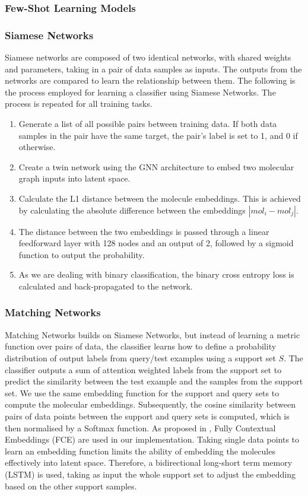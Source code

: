 \subsubsection{Few-Shot Learning Models}

\subsubsection{Siamese Networks}

Siamese networks \citep{koch2015siamese} are composed of two identical networks, with shared weights and parameters, taking in a pair of data samples as inputs. The outputs from the networks are compared to learn the relationship between them. The following is the process employed for learning a classifier using Siamese Networks. The process is repeated for all training tasks.

\begin{enumerate}
    \item Generate a list of all possible pairs between training data. If both data samples in the pair have the same target, the pair's label is set to 1, and 0 if otherwise.
    \item Create a twin network using the \ac{GNN} architecture to embed two molecular graph inputs into latent space.
    \item Calculate the L1 distance between the molecule embeddings. This is achieved by calculating the absolute difference between the embeddings $|mol_i-mol_j|$.
    \item The distance between the two embeddings is passed through a linear feedforward layer with 128 nodes and an output of 2, followed by a sigmoid function to output the probability.
    \item As we are dealing with binary classification, the binary cross entropy loss is calculated and back-propagated to the network.
\end{enumerate}

\subsubsection{Matching Networks}

Matching Networks builds on Siamese Networks, but instead of learning a metric function over pairs of data, the classifier learns how to define a probability distribution of output labels from query/test examples using a support set $S$. The classifier outputs a sum of attention weighted labels from the support set to predict the similarity between the test example and the samples from the support set. We use the same embedding function for the support and query sets to compute the molecular embeddings. Subsequently, the cosine similarity between pairs of data points between the support and query sets is computed, which is then normalised by a Softmax function. As proposed in \citet{vinyals2016matching}, Fully Contextual Embeddings (FCE) are used in our implementation. Taking single data points to learn an embedding function limits the ability of embedding the molecules effectively into latent space. Therefore, a bidirectional long-short term memory (LSTM) is used, taking as input the whole support set to adjust the embedding based on the other support samples.

